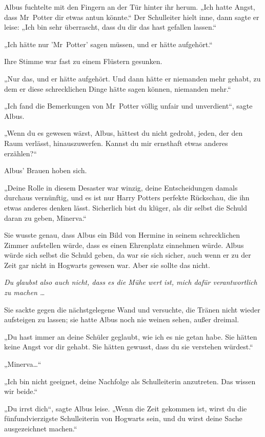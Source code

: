 {Albus fuchtelte mit den Fingern an der Tür hinter ihr herum. „Ich hatte Angst, dass Mr~Potter dir etwas antun könnte.“ Der Schulleiter hielt inne, dann sagte er leise: „Ich bin sehr überrascht, dass du dir das hast gefallen lassen.“

„Ich hätte nur 'Mr~Potter' sagen müssen, und er hätte aufgehört.“

Ihre Stimme war fast zu einem Flüstern gesunken.

„Nur das, und er hätte aufgehört. Und dann hätte er niemanden mehr gehabt, zu dem er diese schrecklichen Dinge hätte sagen können, niemanden mehr.“

„Ich fand die Bemerkungen von Mr~Potter völlig unfair und unverdient“, sagte Albus.

„Wenn du es gewesen wärst, Albus, hättest du nicht gedroht, jeden, der den Raum verlässt, hinauszuwerfen. Kannst du mir ernsthaft etwas anderes erzählen?“

Albus' Brauen hoben sich.

„Deine Rolle in diesem Desaster war winzig, deine Entscheidungen damals durchaus vernünftig, und es ist nur Harry Potters perfekte Rückschau, die ihn etwas anderes denken lässt. Sicherlich bist du klüger, als dir selbst die Schuld daran zu geben, Minerva.“

Sie wusste genau, dass Albus ein Bild von Hermine in seinem schrecklichen Zimmer aufstellen würde, dass es einen Ehrenplatz einnehmen würde. Albus würde sich selbst die Schuld geben, da war sie sich sicher, auch wenn er zu der Zeit gar nicht in Hogwarts gewesen war. Aber sie sollte das nicht.

\emph{Du glaubst also auch nicht, dass es die Mühe wert ist, mich dafür verantwortlich zu machen …}

Sie sackte gegen die nächstgelegene Wand und versuchte, die Tränen nicht wieder aufsteigen zu lassen; sie hatte Albus noch nie weinen sehen, außer dreimal.

„Du hast immer an deine Schüler geglaubt, wie ich es nie getan habe. Sie hätten keine Angst vor dir gehabt. Sie hätten gewusst, dass du sie verstehen würdest.“

„Minerva…“

„Ich bin nicht geeignet, deine Nachfolge als Schulleiterin anzutreten. Das wissen wir beide.“

„Du irrst dich“, sagte Albus leise. „Wenn die Zeit gekommen ist, wirst du die fünfundvierzigste Schulleiterin von Hogwarts sein, und du wirst deine Sache ausgezeichnet machen.“

}
